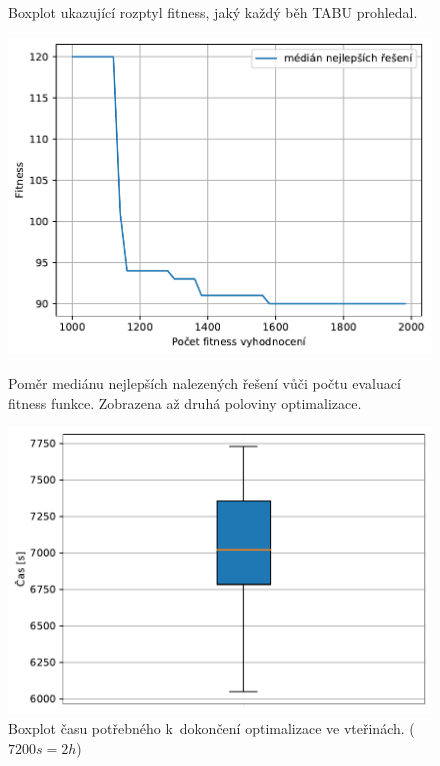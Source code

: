 \begin{figure}[H]
\begin{minipage}[t]{0.475\linewidth}
\caption{Boxplot ukazující rozptyl fitness, jaký každý běh TABU prohledal.}
\label{fg:hifu:tabu:lastGen}
\end{minipage}
\end{figure}

\begin{figure}[H]
\begin{minipage}[t]{0.475\linewidth}
	\includegraphics[width=\textwidth]{obrazky-figures/statistics/HIFU/blob/4/TABU/bestsToFitness_1.pdf}
	\caption{Poměr mediánu nejlepších nalezených řešení vůči počtu evaluací fitness funkce.  Zobrazena až druhá poloviny optimalizace.}
	\label{fg:hifu:tabu:fitPerf}
\end{minipage}
\hfill
\begin{minipage}[t]{0.475\linewidth}
\includegraphics[width=\linewidth]{obrazky-figures/statistics/HIFU/blob/4/TABU/timeBoxplot_WithOutliers.pdf}
\caption{Boxplot času potřebného k~dokončení optimalizace ve vteřinách. ($7200s = 2h$)}
\label{fg:hifu:tabu:time}
\end{minipage}
\end{figure}


